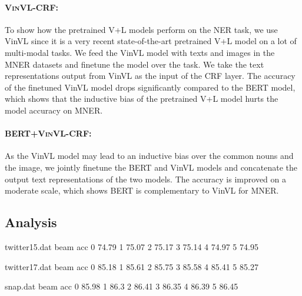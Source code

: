 \documentclass[11pt]{article}
\begin{document}
\paragraph{\textsc{\bf VinVL-CRF}:} To show how the pretrained V+L models perform on the NER task, we use VinVL since it is a very recent state-of-the-art pretrained V+L model on a lot of multi-modal tasks. We feed the VinVL model with texts and images in the MNER datasets and finetune the model over the task. We take the text representations output from VinVL as the input of the CRF layer. The accuracy of the finetuned VinVL model drops significantly compared to the BERT model, which shows that the inductive bias of the pretrained V+L model hurts the model accuracy on MNER.
\paragraph{\textsc{\bf BERT+VinVL-CRF}:} As the VinVL model may lead to an inductive bias over the common nouns and the image, we jointly finetune the BERT and VinVL models and concatenate the output text representations of the two models. The accuracy is improved on a moderate scale, which shows BERT is complementary to VinVL for MNER.




\subsection{Analysis}


\begin{filecontents}{twitter15.dat}
beam	acc
0	74.79
1	75.07	
2	75.17
3	75.14
4	74.97	
5	74.95	
\end{filecontents}

\begin{filecontents}{twitter17.dat}
beam acc
0	85.18
1	85.61
2	85.75
3	85.58
4	85.41
5	85.27
\end{filecontents}

\begin{filecontents}{snap.dat}
beam acc
0   85.98
1	86.3
2	86.41
3	86.35
4	86.39
5	86.45

\end{filecontents}
\end{document}
